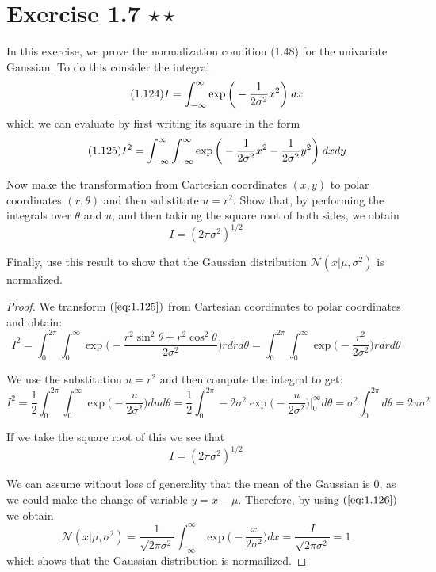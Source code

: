 \section*{Exercise 1.7 $\star \star$}
In this exercise, we prove the normalization condition (1.48) for the univariate
Gaussian. To do this consider the integral
\begin{equation}\label{eq:1.124}\tag{1.124}
    I = \int_{-\infty}^{\infty} \exp\bigg(-\frac{1}{2\sigma^2}x^2\bigg) \hspace{0.25em} dx
\end{equation}
which we can evaluate by first writing its square in the form
\begin{equation}\label{eq:1.125}\tag{1.125}
    I^2 = \int_{-\infty}^{\infty} \int_{-\infty}^{\infty} \exp 
        \bigg(-\frac{1}{2\sigma^2}x^2 - \frac{1}{2\sigma^2}y^2\bigg) \hspace{0.25em} dxdy
\end{equation}

Now make the transformation from Cartesian coordinates $(x, y)$ to polar coordinates $(r, \theta)$ 
and then substitute $u = r^2$. Show that, by performing the integrals over $\theta$ and $u$,
and then takinng the square root of both sides, we obtain
\begin{equation}\label{eq:1.126}\tag{1.126}
    I = (2\pi\sigma^2)^{1/2}
\end{equation}

Finally, use this result to show that the Gaussian distribution $\mathcal{N}(x | \mu, \sigma^2)$ is 
normalized.

\vspace{1em}

\begin{proof}
    We transform $(\ref{eq:1.125})$ from Cartesian coordinates to polar coordinates and obtain:
\[
    I^2 = \int_{0}^{2\pi} \int_0^\infty \exp 
        \bigg(-\frac{r^2\sin^2 \theta + r^2\cos^2 \theta}{2\sigma^2}\bigg) rdrd\theta
        = \int_{0}^{2\pi} \int_{0}^{\infty} \exp \bigg(-\frac{r^2}{2\sigma^2}\bigg) rdrd\theta
    \] 

    We use the substitution $u = r^2$ and then compute the integral to get:
    \[
        I^2 = \frac{1}{2} \int_{0}^{2\pi} \int_{0}^{\infty} \exp\bigg(-\frac{u}{2\sigma^2}\bigg) dud\theta
        = \frac{1}{2} \int_0^{2\pi} -2\sigma^2 \exp\bigg(-\frac{u}{2\sigma^2}\bigg)\bigg|_0^\infty d\theta
        = \sigma^2 \int_{0}^{2\pi} d\theta = 2\pi\sigma^2
    \] 

    If we take the square root of this we see that
    \begin{equation}\tag{1.126}
        I = (2\pi\sigma^2)^{1/2}
    \end{equation}

    We can assume without loss of generality that the mean of the Gaussian is 0,
    as we could make the change of variable $y = x - \mu$. Therefore, by using
    $(\ref{eq:1.126})$ we obtain
    \[
        \mathcal{N}(x | \mu, \sigma^2) 
        = \frac{1}{\sqrt{2\pi\sigma^2}} \int_{-\infty}^{\infty} \exp\bigg(-\frac{x}{2\sigma^2}\bigg) dx
        = \frac{I}{\sqrt{2\pi\sigma^2}} = 1
    \] 
    which shows that the Gaussian distribution is normailized.
\end{proof}


